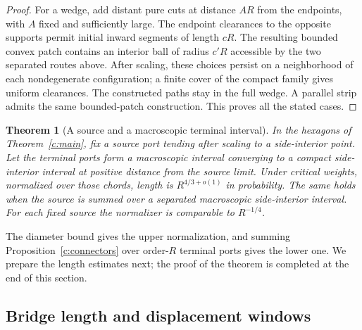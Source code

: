 \documentclass[11pt]{article}
\numberwithin{equation}{section}
\newtheorem{theorem}{Theorem}[section]
\theoremstyle{definition}\newtheorem{definition}[theorem]{Definition}
\theoremstyle{remark}\newtheorem{remark}[theorem]{Remark}
\begin{document}
\begin{proof}
For a wedge, add distant pure cuts at distance $AR$ from the endpoints,
with $A$ fixed and sufficiently large. The endpoint clearances to the
opposite supports permit initial inward segments of length $cR$.
The resulting bounded convex patch contains an interior ball of radius
$c'R$ accessible by the two separated routes above. After scaling, these
choices persist on a neighborhood of each nondegenerate configuration;
a finite cover of the compact family gives uniform clearances. The
constructed paths stay in the full wedge. A parallel strip admits the
same bounded-patch construction. This proves all the stated cases.
\end{proof}

\begin{theorem}[A source and a macroscopic terminal interval]\label{c:window-law}
In the hexagons of Theorem~\ref{c:main}, fix a source port tending after
scaling to a side-interior point. Let the terminal ports form a
macroscopic interval converging to a compact side-interior interval at
positive distance from the source limit. Under critical weights,
normalized over those chords, length is $R^{4/3+o(1)}$ in probability.
The same holds when the source is summed over a separated macroscopic
side-interior interval. For each fixed source the normalizer is
comparable to $R^{-1/4}$.
\end{theorem}

The diameter bound gives the upper normalization, and summing
Proposition~\ref{c:connectors} over order-$R$ terminal ports gives the
lower one. We prepare the length estimates next; the proof of the theorem
is completed at the end of this section.

\subsection{Bridge length and displacement windows}
\end{document}
